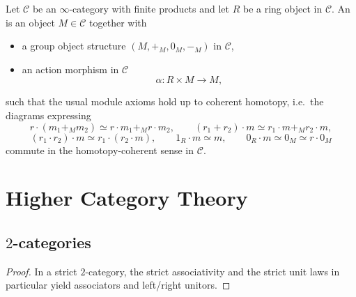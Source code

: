 \begin{definition}
Let $\mathcal{C}$ be an $\infty$-category with finite products and let $R$ be a ring object in $\mathcal{C}$.
An  is an object $M \in \mathcal{C}$ together with
\begin{itemize}
  \item a group object structure $(M,+_M,0_M,-_M)$ in $\mathcal{C}$,
  \item an action morphism in $\mathcal{C}$
  $$
  \alpha : R \times M \to M,
  $$
\end{itemize}
such that the usual module axioms hold up to coherent homotopy, i.e.\ the diagrams expressing
$$
r \cdot (m_1 +_M m_2) \simeq r \cdot m_1 +_M r \cdot m_2,
\qquad
(r_1 + r_2) \cdot m \simeq r_1 \cdot m +_M r_2 \cdot m,
$$
$$
(r_1 \cdot r_2) \cdot m \simeq r_1 \cdot (r_2 \cdot m),
\qquad
1_R \cdot m \simeq m,
\qquad
0_R \cdot m \simeq 0_M \simeq r \cdot 0_M
$$
commute in the homotopy-coherent sense in $\mathcal{C}$.
\end{definition}




\section{Higher Category Theory}

\subsection{$2$-categories}






\begin{proof}
    In a strict $2$-category, the strict associativity and the strict unit laws in particular yield associators and left/right unitors.
\end{proof}








